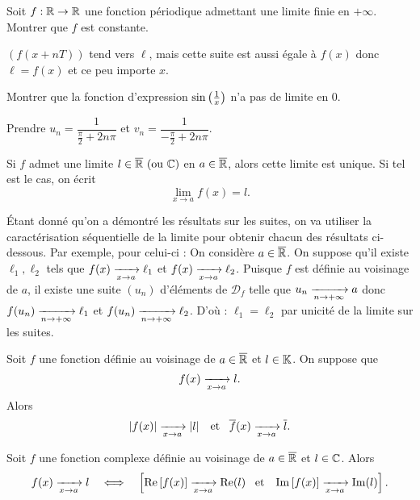 \documentclass{magnolia}
\begin{document}
\begin{exos}
\exo Soit $f:\mathbb{R}\to\mathbb{R}$ une fonction périodique admettant une limite finie en
  $+\infty$. Montrer que $f$ est constante.
  \begin{sol}
  $(f(x+nT))$ tend vers $\ell$, mais cette suite est aussi égale à $f(x)$ donc $\ell=f(x)$ et ce peu importe $x$.
  \end{sol}
\exo Montrer que la fonction d'expression $\sin\left(\frac{1}{x}\right)$ n'a pas de
  limite en 0.
  \begin{sol}
  Prendre $u_n=\dfrac{1}{\frac{\pi}{2}+2n\pi}$ et $v_n=\dfrac{1}{-\frac{\pi}{2}+2n\pi}$.
  \end{sol}
\end{exos}

\begin{proposition}[utile=-3]
Si $f$ admet une limite $l\in\text{$\overline{\mathbb{R}}$ (ou $\mathbb{C}$)}$ en $a\in\overline{\mathbb{R}}$, alors cette limite
est unique. Si tel est le cas, on écrit
\[\lim_{x\to a} f(x)=l.\]
\end{proposition}

\begin{preuve}
\'Etant donné qu'on a démontré les résultats sur les suites, on va utiliser la caractérisation séquentielle de la limite pour obtenir chacun des résultats ci-dessous. Par exemple, pour celui-ci :
On considère $a\in \overline{\mathbb{R}}$. On suppose qu'il existe $\ell_1, \ell_2$ tels que $f(x)\xrightarrow[x\rightarrow a]{} \ell_1$ et $f(x)\xrightarrow[x\rightarrow a]{} \ell_2$. Puisque $f$ est définie au voisinage de $a$, il existe une suite $(u_n)$ d'éléments de $\mathcal{D}_f$ telle que $u_n\xrightarrow[n\rightarrow +\infty]{}{a}$ donc $f(u_n)\xrightarrow[n\rightarrow +\infty]{}{\ell_1}$ et $f(u_n)\xrightarrow[n\rightarrow +\infty]{}{\ell_2}$. D'où : $\ell_1=\ell_2$ par unicité de la limite sur les suites.
\end{preuve}

\begin{proposition}[utile=-3]
Soit $f$ une fonction définie au voisinage de $a\in\overline{\mathbb{R}}$
et $l\in\mathbb{K}$. On suppose que
\[f(x)\xrightarrow[x\rightarrow a]{} l.\]
Alors
\[\left|f(x)\right|\xrightarrow[x\rightarrow a]{} \left|l\right| \quad\!\text{et}\quad\!
  \overline{f}(x)\xrightarrow[x\rightarrow a]{} \overline{l}.\]
\end{proposition}

\begin{proposition}[utile=-3]
Soit $f$ une fonction complexe définie au voisinage de $a\in\overline{\mathbb{R}}$ et $l\in\mathbb{C}$.
Alors
\[f(x)\xrightarrow[x\rightarrow a]{} l \quad\Longleftrightarrow\quad \left[\mathop{\rm Re}\left[f(x)\right]\xrightarrow[x\rightarrow a]{}\mathop{\rm Re}(l) \quad\!\text{et}\quad\!
  \mathop{\rm Im}\left[f(x)\right]\xrightarrow[x\rightarrow a]{}\mathop{\rm Im}(l)\right].\]
\end{proposition}
\end{document}
